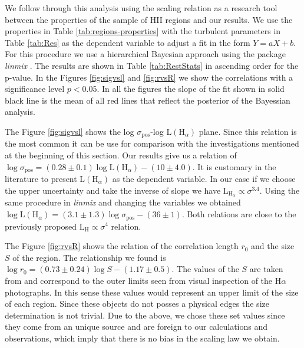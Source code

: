 \documentclass[fleqn,usenatbib, useAMS, a4paper]{mnras}
\newcommand\pos{\ensuremath{_{\mathrm{pos}}}}
\newcommand\ha{\ensuremath{\text{H}\alpha}}
\begin{document}
We follow through this analysis using the scaling relation as a research tool between the properties of the sample of HII regions and our results. 
We use the properties in Table \ref{tab:regions-properties} with the turbulent parameters in Table \ref{tab:Res} as the dependent variable to adjust a fit in the form \(Y = aX +b\). 
For this procedure we use a hierarchical Bayesian approach using the package \textit{linmix} \citep{2007ApJ...665.1489K}.
The results are shown in Table \ref{tab:RestStats} in ascending order for the p-value.
In the Figures \ref{fig:sigvsl} and \ref{fig:rvsR} we show the correlations with a significance level  $p < $0.05.
In all the figures the slope of the fit shown in solid black line is the mean of all red lines that reflect the posterior of the Bayessian analysis.

The Figure \ref{fig:sigvsl} shows the log \(\sigma\pos\)-log \(\text{L}(\text{H}_{\alpha})\) plane.
Since this relation is the most common it can be use for comparison with the investigations mentioned at the beginning of this section.
Our results give us a relation of \(\log \sigma\pos = (0.28 \pm 0.1) \log \text{L}(\text{H}_{\alpha})-(10 \pm 4.0)\).
It is customary in the literature to present \(\text{L} (\text{H}_{\alpha})\) as the dependent variable.
In our case if we choose the upper uncertainty and take the inverse of slope we have \(\text{L}_{\text{H}_{\alpha}} \propto \sigma^{3.4}\). 
Using the same procedure in \textit{linmix} and changing the variables we obtained \(\log \text{L}(\text{H}_{\alpha}) = (3.1\pm 1.3) \log \sigma\pos -(36 \pm 1)\).
Both relations are close to the previously proposed \(\text{L}_{\text{H}} \propto \sigma^{4}\) relation.

The Figure \ref{fig:rvsR} shows the relation of the correlation length \(r_0\) and the size \(S\) of the region. 
The relationship we found is \(\log r_0 = (0.73 \pm 0.24) \log S - (1.17 \pm 0.5)\).
The values of the \(S\) are taken from \citet{1984ApJ...287..116K} and correspond to the outer
limits seen from visual inspection of the \ha{} photographs.
In this sense these values would represent an upper limit of the size of each region.
Since these objects do not posses a physical edges the size determination is not trivial.
Due to the above, we chose these set values since they come from an unique source and are foreign to our calculations and observations, which imply that there is no bias in the scaling law we obtain.  
\end{document}
